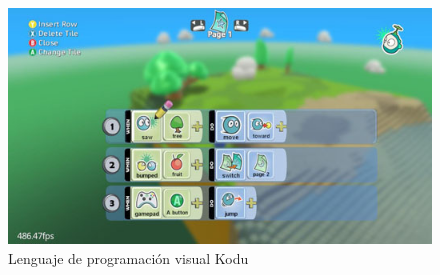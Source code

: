 \begin{itemize}
\begin{figure}[H]
\centering
\includegraphics[scale=1]{img/kodu.jpg}
\caption{Lenguaje de programación visual Kodu}
\label{fig:kodu}
\end{figure}


\end{itemize}
